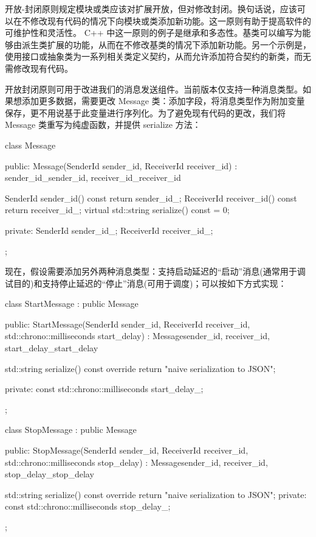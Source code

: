开放-封闭原则规定模块或类应该对扩展开放，但对修改封闭。换句话说，应该可以在不修改现有代码的情况下向模块或类添加新功能。这一原则有助于提高软件的可维护性和灵活性。 C++ 中这一原则的例子是继承和多态性。基类可以编写为能够由派生类扩展的功能，从而在不修改基类的情况下添加新功能。另一个示例是，使用接口或抽象类为一系列相关类定义契约，从而允许添加符合契约的新类，而无需修改现有代码。

开放封闭原则可用于改进我们的消息发送组件。当前版本仅支持一种消息类型。如果想添加更多数据，需要更改 Message 类：添加字段，将消息类型作为附加变量保存，更不用说基于此变量进行序列化。为了避免现有代码的更改，我们将 Message 类重写为纯虚函数，并提供 serialize 方法：

\begin{cpp}
class Message {
public:
    Message(SenderId sender_id, ReceiverId receiver_id)
        : sender_id_{sender_id}, receiver_id_{receiver_id} {}

    SenderId sender_id() const { return sender_id_; }
    ReceiverId receiver_id() const { return receiver_id_; }
    virtual std::string serialize() const = 0;

private:
    SenderId sender_id_;
    ReceiverId receiver_id_;
};
\end{cpp}

现在，假设需要添加另外两种消息类型：支持启动延迟的“启动”消息(通常用于调试目的)和支持停止延迟的“停止”消息(可用于调度)；可以按如下方式实现：

\begin{cpp}
class StartMessage : public Message {
public:
    StartMessage(SenderId sender_id, ReceiverId receiver_id,
                 std::chrono::milliseconds start_delay)
        : Message{sender_id, receiver_id},
            start_delay_{start_delay} {}

    std::string serialize() const override {
        return {"naive serialization to JSON"};
    }

private:
    const std::chrono::milliseconds start_delay_;
};

class StopMessage : public Message {
public:
    StopMessage(SenderId sender_id, ReceiverId receiver_id,
                std::chrono::milliseconds stop_delay)
        : Message{sender_id, receiver_id},
        stop_delay_{stop_delay} {}

    std::string serialize() const override {
        return {"naive serialization to JSON"};
    }
private:
    const std::chrono::milliseconds stop_delay_;
};
\end{cpp}


